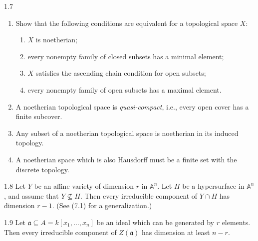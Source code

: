 \documentclass[12pt]{article}
\begin{document}
\begin{problem}{1.7}
\begin{enumerate}
    \item[(a)] Show that the following conditions are equivalent for a topological space $X$:
    \begin{enumerate}
        \item[(i)] $X$ is noetherian;
        \item[(ii)] every nonempty family of closed subsets has a minimal element;
        \item[(iii)] $X$ satisfies the ascending chain condition for open subsets;
        \item[(iv)] every nonempty family of open subsets has a maximal element.
    \end{enumerate}

    \item[(b)] A noetherian topological space is \emph{quasi-compact}, i.e., every open cover has a finite subcover.

    \item[(c)] Any subset of a noetherian topological space is noetherian in its induced topology.

    \item[(d)] A noetherian space which is also Hausdorff must be a finite set with the discrete topology.
\end{enumerate}
\end{problem}

\begin{problem}{1.8}
Let $Y$ be an affine variety of dimension $r$ in $\mathbb A^n$. Let $H$ be a hypersurface in $\mathbb A^n$, and assume that $Y \nsubseteq H$. Then every irreducible component of $Y\cap H$ has dimension $r-1$. (See (7.1) for a generalization.)
\end{problem}

\begin{problem}{1.9}
Let $\mathfrak a\subseteq A=k[x_1,\ldots,x_n]$ be an ideal which can be generated by $r$ elements. Then every irreducible component of $Z(\mathfrak a)$ has dimension at least $n-r$.
\end{problem}
\end{document}
